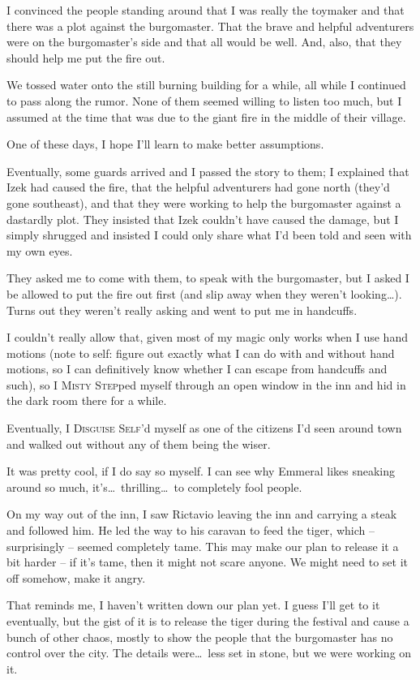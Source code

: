I convinced the people standing around that I was really the toymaker and that there was a plot against the burgomaster. That the brave and helpful adventurers were on the burgomaster's side and that all would be well. And, also, that they should help me put the fire out.

We tossed water onto the still burning building for a while, all while I continued to pass along the rumor. None of them seemed willing to listen too much, but I assumed at the time that was due to the giant fire in the middle of their village.

One of these days, I hope I'll learn to make better assumptions.

Eventually, some guards arrived and I passed the story to them; I explained that Izek had caused the fire, that the helpful adventurers had gone north (they'd gone southeast), and that they were working to help the burgomaster against a dastardly plot. They insisted that Izek couldn't have caused the damage, but I simply shrugged and insisted I could only share what I'd been told and seen with my own eyes.

They asked me to come with them, to speak with the burgomaster, but I asked I be allowed to put the fire out first (and slip away when they weren't looking\dots). Turns out they weren't really asking and went to put me in handcuffs.

I couldn't really allow that, given most of my magic only works when I use hand motions (note to self: figure out exactly what I can do with and without hand motions, so I can definitively know whether I can escape from handcuffs and such), so I \textsc{Misty Step}ped myself through an open window in the inn and hid in the dark room there for a while.

Eventually, I \textsc{Disguise Self}'d myself as one of the citizens I'd seen around town and walked out without any of them being the wiser.

It was pretty cool, if I do say so myself. I can see why Emmeral likes sneaking around so much, it's\dots\ thrilling\dots\ to completely fool people.

On my way out of the inn, I saw Rictavio leaving the inn and carrying a steak and followed him. He led the way to his caravan to feed the tiger, which -- surprisingly -- seemed completely tame. This may make our plan to release it a bit harder -- if it's tame, then it might not scare anyone. We might need to set it off somehow, make it angry.

That reminds me, I haven't written down our plan yet. I guess I'll get to it eventually, but the gist of it is to release the tiger during the festival and cause a bunch of other chaos, mostly to show the people that the burgomaster has no control over the city. The details were\dots\ less set in stone, but we were working on it.

